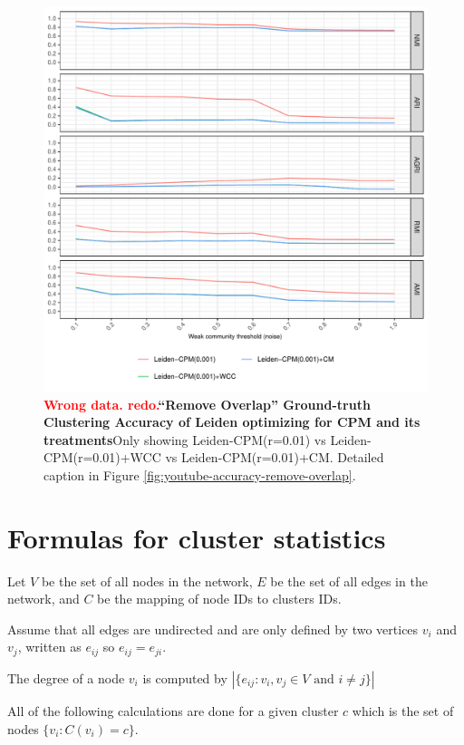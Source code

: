 \documentclass[aps,pre,superscriptaddress]{revtex4}
\begin{document}
\begin{figure}[!htpb]
	\centering
	\includegraphics[]{figures/remove_overlap_youtube_leiden_cpm_accuracy.pdf}
	\caption[]{\textbf{\textcolor{red}{Wrong data. redo.}``Remove Overlap'' Ground-truth Clustering Accuracy of Leiden optimizing for CPM and its treatments}Only showing Leiden-CPM(r=0.01) vs Leiden-CPM(r=0.01)+WCC vs Leiden-CPM(r=0.01)+CM. Detailed caption in Figure \ref{fig:youtube-accuracy-remove-overlap}.}
	\label{fig:remove-overlap-leiden-cpm}
\end{figure}

\clearpage
\section{Formulas for cluster statistics}
Let $V$ be the set of all nodes in the network, $E$ be the set of all edges in the network, and $C$ be the mapping of node IDs to clusters IDs.

Assume that all edges are undirected and are only defined by two vertices $v_{i}$ and $v_{j}$, written as $e_{ij}$ so $e_{ij} = e_{ji}$.

The degree of a node $v_{i}$ is computed by $|\{e_{ij} :v_{i},v_{j} \in V \text{ and } i \neq j\}|$

All of the following calculations are done for a given cluster $c$ which is the set of nodes $\{v_{i} : C(v_{i}) = c\}$.
\end{document}
